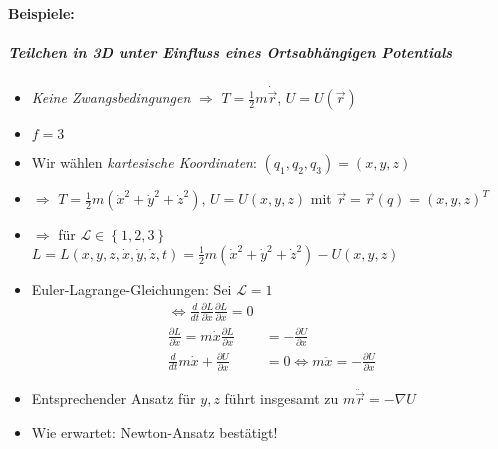 \paragraph*{Beispiele:}
\subparagraph{Teilchen in 3D unter Einfluss eines Ortsabhängigen  Potentials}
\begin{itemize}
\item \emph{Keine Zwangsbedingungen} $\Rightarrow$
  $T = \frac{1}{2}m\dot\vec{r}$, $U=U \left( \vec{r} \right)$
\item $f=3$
\item Wir wählen \emph{kartesische Koordinaten}: $\left( q_1,q_2,q_3 \right) = (x,y,z)$
\item $\Rightarrow$
  $T = \frac{1}{2}m \left( \dot{x}^2 + \dot{y}^2 + \dot{z}^2 \right)$,
  $U = U(x,y,z)$ mit
  $\vec{r} = \vec{r}(q) = (x,y,z)^T$
\item $\Rightarrow$ für $\mathcal{L}\in \left\{ 1,2,3 \right\}$
  $L = L(x,y,z,\dot{x},\dot{y},\dot{z},t) = \frac{1}{2}m \left(
    \dot{x}^2 + \dot{y}^2 + \dot{z}^2 \right) - U(x,y,z)$
\item Euler-Lagrange-Gleichungen: Sei $\mathcal{L}=1$
\begin{align*}
  \Leftrightarrow
  \frac{d}{dt}\frac{\partial L}{\partial \dot{x}} \frac{\partial L}{\partial x} = 0\\
  \frac{\partial L}{\partial \dot{x}} = m\dot{x}
  \frac{\partial L}{\partial x}
&= - \frac{\partial U}{\partial x}\\
  \frac{d}{dt}m\dot{x} + \frac{\partial U}{\partial x}
&= 0
  \Leftrightarrow m \ddot{x} = - \frac{\partial U}{\partial x}
\end{align*}
\item Entsprechender Ansatz für $y,z$ führt insgesamt zu $m\ddot\vec{r}=-\nabla U$
\item Wie erwartet: Newton-Ansatz bestätigt!
\end{itemize}


